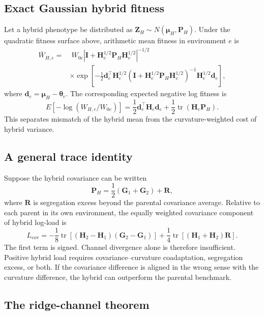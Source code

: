 \documentclass[11pt,a4paper]{article}
\newcommand{\G}{\mathbf G}
\newcommand{\Hh}{\mathbf H}
\newcommand{\Rr}{\mathbf R}
\newcommand{\Pp}{\mathbf P}
\newcommand{\tr}{\operatorname{tr}}
\begin{document}
\subsection{Exact Gaussian hybrid fitness}

Let a hybrid phenotype be distributed as \(\mathbf Z_H\sim N(\bm\mu_H,\Pp_H)\). Under the quadratic fitness surface above, arithmetic mean fitness in environment \(e\) is
\begin{align}
\bar W_{H,e}
=&\;W_{0e}\left|\mathbf I+\Hh_e^{1/2}\Pp_H\Hh_e^{1/2}\right|^{-1/2}\\
&\times\exp\left[-\frac12\mathbf d_e^\top\Hh_e^{1/2}
\left(\mathbf I+\Hh_e^{1/2}\Pp_H\Hh_e^{1/2}\right)^{-1}
\Hh_e^{1/2}\mathbf d_e\right],
\end{align}
where \(\mathbf d_e=\bm\mu_H-\bm\theta_e\). The corresponding expected negative log fitness is
\begin{equation}
E[-\log(W_{H,e}/W_{0e})]
=\frac12\mathbf d_e^\top\Hh_e\mathbf d_e
+\frac12\tr(\Hh_e\Pp_H).
\end{equation}
This separates mismatch of the hybrid mean from the curvature-weighted cost of hybrid variance.

\subsection{A general trace identity}

Suppose the hybrid covariance can be written
\begin{equation}
\Pp_H=\frac12(\G_1+\G_2)+\Rr,
\end{equation}
where \(\Rr\) is segregation excess beyond the parental covariance average. Relative to each parent in its own environment, the equally weighted covariance component of hybrid log-load is
\begin{equation}
L_{\mathrm{cov}}
=-\frac18\tr[(\Hh_2-\Hh_1)(\G_2-\G_1)]
+\frac14\tr[(\Hh_1+\Hh_2)\Rr].
\end{equation}
The first term is signed. Channel divergence alone is therefore insufficient. Positive hybrid load requires covariance--curvature coadaptation, segregation excess, or both. If the covariance difference is aligned in the wrong sense with the curvature difference, the hybrid can outperform the parental benchmark.

\subsection{The ridge-channel theorem}
\end{document}
